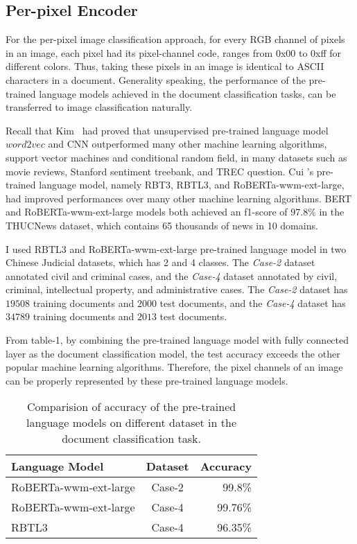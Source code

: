 \documentclass[review]{cvpr}
\begin{document}
\subsection{Per-pixel Encoder}

For the per-pixel image classification approach, for every RGB channel of pixels in an image,
each pixel had its pixel-channel code, ranges from 0x00 to 0xff for different colors.
Thus, taking these pixels in an image is identical to ASCII characters in a document.
Generality speaking, the performance of the pre-trained language models achieved in the document classification tasks, can be transferred to image classification naturally.

\par Recall that Kim~\cite{kim2014convolutional} had proved that unsupervised pre-trained language model $word2vec$ and CNN outperformed many other machine learning algorithms,
\eg support vector machines and conditional random field, in many datasets such as movie reviews, Stanford sentiment treebank, and TREC question.
Cui \etal's pre-trained language model, namely RBT3, RBTL3, and RoBERTa-wwm-ext-large, had improved performances over many other machine learning algorithms.
BERT and RoBERTa-wwm-ext-large models both achieved an f1-score of 97.8\% in the THUCNews dataset, which contains 65 thousands of news in 10 domains.

\par I used RBTL3 and RoBERTa-wwm-ext-large pre-trained language model in two Chinese Judicial datasets, which has 2 and 4 classes.
The \textit{Case-2} dataset annotated civil and criminal cases, and the \textit{Case-4} dataset annotated by civil, criminal, intellectual property, and administrative cases.
The \textit{Case-2} dataset has $19508$ training documents and $2000$ test documents, and the \textit{Case-4} dataset has $34789$ training documents and $2013$ test documents.

\par From table-1, by combining the pre-trained language model with fully connected layer as the document classification model,
the test accuracy exceeds the other popular machine learning algorithms.
Therefore, the pixel channels of an image can be properly represented by these pre-trained language models.

\begin{table}
\begin{center}
\begin{tabular}{|l|c|r|}
\hline
Language Model 	& Dataset & Accuracy \\
\hline\hline
RoBERTa-wwm-ext-large & Case-2	&	99.8\% \\
RoBERTa-wwm-ext-large & Case-4	&	99.76\% \\
RBTL3  & Case-4	&	96.35\% \\
\hline
\end{tabular}
\end{center}
\caption{Comparision of accuracy of the pre-trained language models on different dataset in the document classification task.}
\end{table}
\end{document}
